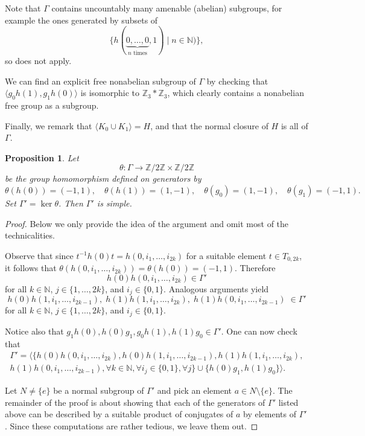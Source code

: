 \documentclass[a4paper]{amsart}
\theoremstyle{plain}
\newtheorem{proposition}[theorem]{Proposition}
\theoremstyle{definition}
\theoremstyle{remark}
\newcommand{\N}{\mathbb{N}}
\newcommand{\Z}{\mathbb{Z}}
\numberwithin{theorem}{section}
\begin{document}
Note that $\Gamma$ contains uncountably many amenable (abelian) subgroups,
for example the ones generated by subsets of
\[
\{h(\underbrace{0,\dotsc,0}_{n\text{ times}},1) \mid n\in\N)\},
\]
so \cite[Theorem~1.7]{BKKO} does not apply.

We can find an explicit free nonabelian subgroup of $\Gamma$ by
checking that $\langle g_0h(1),g_1h(0) \rangle$ is isomorphic to $\Z_3*\Z_3$,
which clearly contains a nonabelian free group as a subgroup.

Finally, we remark that $\langle K_0 \cup K_1\rangle=H$, and that the normal closure of $H$ is all of $\Gamma$.

\begin{proposition}\label{prop:simple-by-finite}
Let
\[
\theta\colon \Gamma \to \Z/2\Z \times \Z/2\Z
\]
be the group homomorphism defined on generators by
\[
\theta(h(0)) = (-1,1),\quad \theta(h(1)) = (1,-1),\quad \theta(g_0) = (1,-1),\quad \theta(g_1) = (-1,1).
\]
Set $\Gamma'=\ker\theta$.
Then $\Gamma'$ is simple.
\end{proposition}

\begin{proof}
Below we only provide the idea of the argument and omit most of the technicalities.

Observe that since $t^{-1} h(0) t = h(0,i_1, \dotsc, i_{2k})$ for a suitable element $t \in T_{0,2k}$,
it follows that $\theta(h(0,i_1,\dotsc,i_{2k}))=\theta(h(0))=(-1,1)$.
Therefore 
\[
h(0) h(0,i_1, \dotsc, i_{2k}) \in \Gamma'
\]
for all $k\in\N$, $j\in\{1,\dotsc,2k\}$, and $i_j\in\{0,1\}$.
Analogous arguments yield 
\[
h(0) h(1,i_1, \dotsc, i_{2k-1}),\; 
h(1) h(1,i_1, \dotsc, i_{2k}),\;
h(1) h(0,i_1, \dotsc, i_{2k-1})\;
\in\Gamma'
\]
for all $k\in\N$, $j\in\{1,\dotsc,2k\}$, and $i_j\in\{0,1\}$.

Notice also that $g_1h(0),h(0)g_1,g_0h(1),h(1)g_0 \in \Gamma'$.
One can now check that
\begin{multline*} 
\Gamma' = \langle
\{ h(0) h(0,i_1,\dotsc,i_{2k}) , h(0) h(1,i_1,\dotsc,i_{2k-1}), h(1) h(1,i_1,\dotsc,i_{2k}), \\
h(1) h(0,i_1,\dotsc,i_{2k-1}) , \forall k\in\N, \forall i_j\in\{0,1\}, \forall j \} \cup \{ h(0)g_1,h(1)g_0\}
\rangle.
\end{multline*}

Let $N\neq\{e\}$ be a normal subgroup of $\Gamma'$ and pick an element $a \in N\setminus\{e\}$.
The remainder of the proof is about showing that each of the generators of $\Gamma'$ listed above
can be described by a suitable product of conjugates of $a$ by elements of $\Gamma'$.
Since these computations are rather tedious, we leave them out.
\end{proof}
\end{document}
